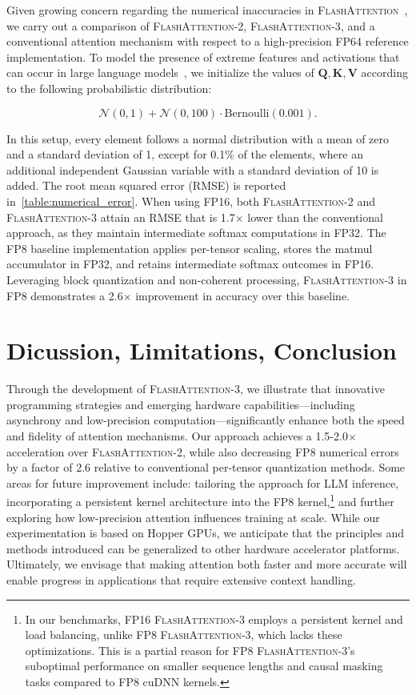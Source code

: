 Given growing concern regarding the numerical inaccuracies in \textsc{FlashAttention}~\citep{golden2024flash}, we carry out a comparison of \textsc{FlashAttention-2}, \textsc{FlashAttention-3}, and a conventional attention mechanism with respect to a high-precision FP64 reference implementation. To model the presence of extreme features and activations that can occur in large language models~\citep{dettmers2208llm, sun2024massive}, we initialize the values of $\mathbf{Q}, \mathbf{K}, \mathbf{V}$ according to the following probabilistic distribution:

\begin{equation*}
  \mathcal{N}(0, 1) + \mathcal{N}(0, 100) \cdot \mathrm{Bernoulli}(0.001).
\end{equation*}

In this setup, every element follows a normal distribution with a mean of zero and a standard deviation of 1, except for 0.1\% of the elements, where an additional independent Gaussian variable with a standard deviation of 10 is added. The root mean squared error (RMSE) is reported in~\cref{table:numerical_error}. When using FP16, both \textsc{FlashAttention-2} and \textsc{FlashAttention-3} attain an RMSE that is 1.7$\times$ lower than the conventional approach, as they maintain intermediate softmax computations in FP32. The FP8 baseline implementation applies per-tensor scaling, stores the matmul accumulator in FP32, and retains intermediate softmax outcomes in FP16. Leveraging block quantization and non-coherent processing, \textsc{FlashAttention-3} in FP8 demonstrates a 2.6$\times$ improvement in accuracy over this baseline.

\section{Dicussion, Limitations, Conclusion}
\label{sec:discussion}

Through the development of \textsc{FlashAttention-3}, we illustrate that innovative programming strategies and emerging hardware capabilities—including asynchrony and low-precision computation—significantly enhance both the speed and fidelity of attention mechanisms. Our approach achieves a 1.5-2.0$\times$ acceleration over \textsc{FlashAttention-2}, while also decreasing FP8 numerical errors by a factor of 2.6 relative to conventional per-tensor quantization methods. Some areas for future improvement include: tailoring the approach for LLM inference, incorporating a persistent kernel architecture into the FP8 kernel,\footnote{In our benchmarks, FP16 \textsc{FlashAttention-3} employs a persistent kernel and load balancing, unlike FP8 \textsc{FlashAttention-3}, which lacks these optimizations. This is a partial reason for FP8 \textsc{FlashAttention-3}'s suboptimal performance on smaller sequence lengths and causal masking tasks compared to FP8 cuDNN kernels.} and further exploring how low-precision attention influences training at scale. While our experimentation is based on Hopper GPUs, we anticipate that the principles and methods introduced can be generalized to other hardware accelerator platforms. Ultimately, we envisage that making attention both faster and more accurate will enable progress in applications that require extensive context handling.

